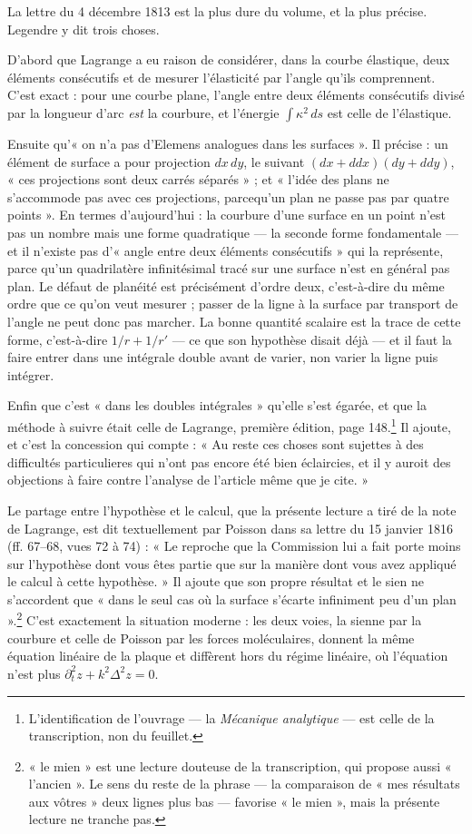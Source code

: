 \documentclass[11pt,a4paper]{article}
\begin{document}
La lettre du 4 décembre 1813 est la plus dure du volume, et la plus précise.
Legendre y dit trois choses.

D'abord que Lagrange a eu raison de considérer, dans la courbe élastique, deux
éléments consécutifs et de mesurer l'élasticité par l'angle qu'ils
comprennent. C'est exact : pour une courbe plane, l'angle entre deux éléments
consécutifs divisé par la longueur d'arc \emph{est} la courbure, et l'énergie
$\int \kappa^2\,ds$ est celle de l'élastique.

Ensuite qu'« on n'a pas d'Elemens analogues dans les surfaces ». Il précise :
un élément de surface a pour projection $dx\,dy$, le suivant
$(dx+ddx)(dy+ddy)$, « ces projections sont deux carrés séparés » ; et
« l'idée des plans ne s'accommode pas avec ces projections, parcequ'un plan ne
passe pas par quatre points ». En termes d'aujourd'hui : la courbure d'une
surface en un point n'est pas un nombre mais une forme quadratique — la
seconde forme fondamentale — et il n'existe pas d'« angle entre deux éléments
consécutifs » qui la représente, parce qu'un quadrilatère infinitésimal tracé
sur une surface n'est en général pas plan. Le défaut de planéité est
précisément d'ordre deux, c'est-à-dire du même ordre que ce qu'on veut
mesurer ; passer de la ligne à la surface par transport de l'angle ne peut
donc pas marcher. La bonne quantité scalaire est la trace de cette forme,
c'est-à-dire $1/r+1/r'$ — ce que son hypothèse disait déjà — et il faut la
faire entrer dans une intégrale double avant de varier, non varier la ligne
puis intégrer.

Enfin que c'est « dans les doubles intégrales » qu'elle s'est égarée, et que
la méthode à suivre était celle de Lagrange, première édition, page
148.\footnote{L'identification de l'ouvrage — la \emph{Mécanique analytique} —
est celle de la transcription, non du feuillet.} Il ajoute, et c'est la
concession qui compte : « Au reste ces choses sont sujettes à des difficultés
particulieres qui n'ont pas encore été bien éclaircies, et il y auroit des
objections à faire contre l'analyse de l'article même que je cite. »

Le partage entre l'hypothèse et le calcul, que la présente lecture a tiré de
la note de Lagrange, est dit textuellement par Poisson dans sa lettre du 15
janvier 1816 (ff. 67–68, vues 72 à 74) : « Le reproche que la Commission lui a
fait porte moins sur l'hypothèse dont vous êtes partie que sur la manière dont
vous avez appliqué le calcul à cette hypothèse. » Il ajoute que son propre
résultat et le sien ne s'accordent que « dans le seul cas où la surface
s'écarte infiniment peu d'un plan ».\footnote{« le mien » est une lecture
douteuse de la transcription, qui propose aussi « l'ancien ». Le sens du reste
de la phrase — la comparaison de « mes résultats aux vôtres » deux lignes plus
bas — favorise « le mien », mais la présente lecture ne tranche pas.} C'est
exactement la situation moderne : les deux voies, la sienne par la courbure et
celle de Poisson par les forces moléculaires, donnent la même équation
linéaire de la plaque et diffèrent hors du régime linéaire, où l'équation
n'est plus $\partial_t^2 z + k^2\Delta^2 z = 0$.
\end{document}
